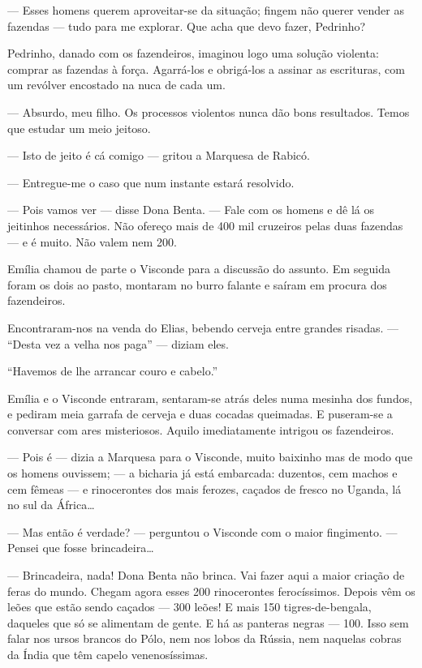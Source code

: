 --- Esses homens querem aproveitar-se da situação; fingem não querer
vender as fazendas --- tudo para me explorar. Que acha que devo fazer,
Pedrinho?

Pedrinho, danado com os fazendeiros, imaginou logo uma solução violenta:
comprar as fazendas à força. Agarrá-los e obrigá-los a assinar as
escrituras, com um revólver encostado na nuca de cada um.

--- Absurdo, meu filho. Os processos violentos nunca dão bons
resultados. Temos que estudar um meio jeitoso.

--- Isto de jeito é cá comigo --- gritou a Marquesa de Rabicó.

--- Entregue-me o caso que num instante estará resolvido.

--- Pois vamos ver --- disse Dona Benta. --- Fale com os homens e dê lá
os jeitinhos necessários. Não ofereço mais de 400 mil cruzeiros pelas
duas fazendas --- e é muito. Não valem nem 200.

Emília chamou de parte o Visconde para a discussão do assunto. Em
seguida foram os dois ao pasto, montaram no burro falante e saíram em
procura dos fazendeiros.

Encontraram-nos na venda do Elias, bebendo cerveja entre grandes
risadas. --- ``Desta vez a velha nos paga'' --- diziam eles.

``Havemos de lhe arrancar couro e cabelo.''

Emília e o Visconde entraram, sentaram-se atrás deles numa mesinha dos
fundos, e pediram meia garrafa de cerveja e duas cocadas queimadas. E
puseram-se a conversar com ares misteriosos. Aquilo imediatamente
intrigou os fazendeiros.

--- Pois é --- dizia a Marquesa para o Visconde, muito baixinho mas de
modo que os homens ouvissem; --- a bicharia já está embarcada: duzentos,
cem machos e cem fêmeas --- e rinocerontes dos mais ferozes, caçados de
fresco no Uganda, lá no sul da África\ldots{}

--- Mas então é verdade? --- perguntou o Visconde com o maior
fingimento. --- Pensei que fosse brincadeira\ldots{}

--- Brincadeira, nada! Dona Benta não brinca. Vai fazer aqui a maior
criação de feras do mundo. Chegam agora esses 200 rinocerontes
ferocíssimos. Depois vêm os leões que estão sendo caçados --- 300 leões!
E mais 150 tigres-de-bengala, daqueles que só se alimentam de gente. E
há as panteras negras --- 100. Isso sem falar nos ursos brancos do Pólo,
nem nos lobos da Rússia, nem naquelas cobras da Índia que têm capelo
venenosíssimas.


